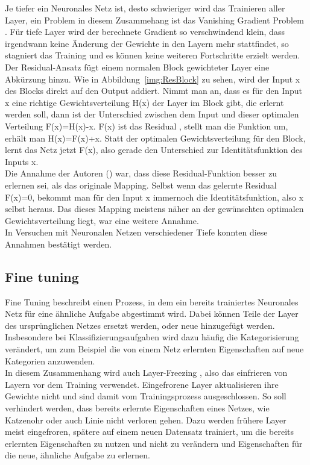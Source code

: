 Je tiefer ein Neuronales Netz ist, desto schwieriger wird das Trainieren aller Layer, ein Problem in diesem Zusammehang ist das \glqq Vanishing Gradient Problem \grqq{}. Für tiefe Layer wird der berechnete Gradient so verschwindend klein, dass irgendwann keine Änderung der Gewichte in den Layern mehr stattfindet, so stagniert das Training und es können keine weiteren Fortschritte erzielt werden.\\
Der Residual-Ansatz fügt einem normalen Block gewichteter Layer eine Abkürzung hinzu. Wie in Abbildung~\ref{img:ResBlock} zu sehen, wird der Input x des Blocks direkt auf den Output addiert. Nimmt man an, dass es für den Input x eine richtige Gewichtsverteilung H(x) der Layer im Block gibt, die erlernt werden soll, dann ist der Unterschied zwischen dem Input und dieser optimalen Verteilung F(x)=H(x)-x. F(x) ist das \glqq Residual \grqq{}, stellt man die Funktion um, erhält man H(x)=F(x)+x. Statt der optimalen Gewichtsverteilung für den Block, lernt das Netz jetzt F(x), also gerade den Unterschied zur Identitätsfunktion des Inputs x.\\
Die Annahme der Autoren (\cite{DBLP:journals/corr/HeZRS15}) war, dass diese Residual-Funktion besser zu erlernen sei, als das originale Mapping. Selbst wenn das gelernte Residual F(x)=0, bekommt man für den Input x immernoch die Identitätsfunktion, also x selbst heraus. Das dieses Mapping meistens näher an der gewünschten optimalen Gewichtsverteilung liegt, war eine weitere Annahme.\\
In Versuchen mit Neuronalen Netzen verschiedener Tiefe konnten diese Annahmen bestätigt werden. 


\subsection{Fine tuning}
Fine Tuning beschreibt einen Prozess, in dem ein bereits trainiertes Neuronales Netz für eine ähnliche Aufgabe abgestimmt wird. Dabei können Teile der Layer des ursprünglichen Netzes ersetzt werden, oder neue hinzugefügt werden. Insbesondere bei Klassifizierungsaufgaben wird dazu häufig die Kategorisierung verändert, um zum Beispiel die von einem Netz erlernten Eigenschaften auf neue Kategorien anzuwenden.\\
In diesem Zusammenhang wird auch \glqq Layer-Freezing \grqq{}, also das einfrieren von Layern vor dem Training verwendet. Eingefrorene Layer aktualisieren ihre Gewichte nicht und sind damit vom Trainingsprozess ausgeschlossen. So soll verhindert werden, dass bereits erlernte Eigenschaften eines Netzes, wie \glqq Katzenohr \grqq{} oder auch \glqq Linie \grqq{} nicht verloren gehen. Dazu werden frühere Layer meist eingefroren, spätere auf einem neuen Datensatz trainiert, um die bereits erlernten Eigenschaften zu nutzen und nicht zu verändern und Eigenschaften für die neue, ähnliche Aufgabe zu erlernen.



